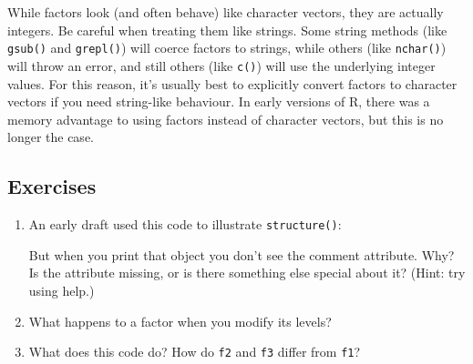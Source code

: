 While factors look (and often behave) like character vectors, they are
actually integers. Be careful when treating them like strings. Some
string methods (like \texttt{gsub()} and \texttt{grepl()}) will coerce
factors to strings, while others (like \texttt{nchar()}) will throw an
error, and still others (like \texttt{c()}) will use the underlying
integer values. For this reason, it's usually best to explicitly convert
factors to character vectors if you need string-like behaviour. In early
versions of R, there was a memory advantage to using factors instead of
character vectors, but this is no longer the case. 

\subsection{Exercises}

\begin{enumerate}
\def\labelenumi{\arabic{enumi}.}
\item
  An early draft used this code to illustrate \texttt{structure()}:

\begin{Shaded}
\begin{Highlighting}[]
\NormalTok{(}\NormalTok{:}\NormalTok{, } \NormalTok{)}
\end{Highlighting}
\end{Shaded}

  But when you print that object you don't see the comment attribute.
  Why? Is the attribute missing, or is there something else special
  about it? (Hint: try using help.) 
\item
  What happens to a factor when you modify its levels?

\begin{Shaded}
\begin{Highlighting}[]
\StringTok{ }
\StringTok{ }\NormalTok{(}
\end{Highlighting}
\end{Shaded}
\item
  What does this code do? How do \texttt{f2} and \texttt{f3} differ from
  \texttt{f1}?

\begin{Shaded}
\begin{Highlighting}[]
\StringTok{ }\NormalTok{(}

\StringTok{ } 
\end{Highlighting}
\end{Shaded}
\end{enumerate}

